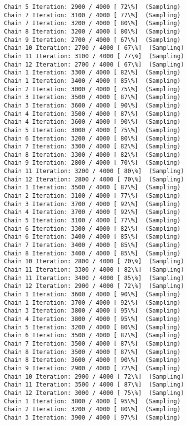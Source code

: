 \documentclass[11pt]{article}
\begin{document}
\begin{Verbatim}[commandchars=\\\{\}]
Chain 5 Iteration: 2900 / 4000 [ 72\%]  (Sampling)
Chain 7 Iteration: 3100 / 4000 [ 77\%]  (Sampling)
Chain 7 Iteration: 3200 / 4000 [ 80\%]  (Sampling)
Chain 8 Iteration: 3200 / 4000 [ 80\%]  (Sampling)
Chain 9 Iteration: 2700 / 4000 [ 67\%]  (Sampling)
Chain 10 Iteration: 2700 / 4000 [ 67\%]  (Sampling)
Chain 11 Iteration: 3100 / 4000 [ 77\%]  (Sampling)
Chain 12 Iteration: 2700 / 4000 [ 67\%]  (Sampling)
Chain 1 Iteration: 3300 / 4000 [ 82\%]  (Sampling)
Chain 1 Iteration: 3400 / 4000 [ 85\%]  (Sampling)
Chain 2 Iteration: 3000 / 4000 [ 75\%]  (Sampling)
Chain 3 Iteration: 3500 / 4000 [ 87\%]  (Sampling)
Chain 3 Iteration: 3600 / 4000 [ 90\%]  (Sampling)
Chain 4 Iteration: 3500 / 4000 [ 87\%]  (Sampling)
Chain 4 Iteration: 3600 / 4000 [ 90\%]  (Sampling)
Chain 5 Iteration: 3000 / 4000 [ 75\%]  (Sampling)
Chain 6 Iteration: 3200 / 4000 [ 80\%]  (Sampling)
Chain 7 Iteration: 3300 / 4000 [ 82\%]  (Sampling)
Chain 8 Iteration: 3300 / 4000 [ 82\%]  (Sampling)
Chain 9 Iteration: 2800 / 4000 [ 70\%]  (Sampling)
Chain 11 Iteration: 3200 / 4000 [ 80\%]  (Sampling)
Chain 12 Iteration: 2800 / 4000 [ 70\%]  (Sampling)
Chain 1 Iteration: 3500 / 4000 [ 87\%]  (Sampling)
Chain 2 Iteration: 3100 / 4000 [ 77\%]  (Sampling)
Chain 3 Iteration: 3700 / 4000 [ 92\%]  (Sampling)
Chain 4 Iteration: 3700 / 4000 [ 92\%]  (Sampling)
Chain 5 Iteration: 3100 / 4000 [ 77\%]  (Sampling)
Chain 6 Iteration: 3300 / 4000 [ 82\%]  (Sampling)
Chain 6 Iteration: 3400 / 4000 [ 85\%]  (Sampling)
Chain 7 Iteration: 3400 / 4000 [ 85\%]  (Sampling)
Chain 8 Iteration: 3400 / 4000 [ 85\%]  (Sampling)
Chain 10 Iteration: 2800 / 4000 [ 70\%]  (Sampling)
Chain 11 Iteration: 3300 / 4000 [ 82\%]  (Sampling)
Chain 11 Iteration: 3400 / 4000 [ 85\%]  (Sampling)
Chain 12 Iteration: 2900 / 4000 [ 72\%]  (Sampling)
Chain 1 Iteration: 3600 / 4000 [ 90\%]  (Sampling)
Chain 1 Iteration: 3700 / 4000 [ 92\%]  (Sampling)
Chain 3 Iteration: 3800 / 4000 [ 95\%]  (Sampling)
Chain 4 Iteration: 3800 / 4000 [ 95\%]  (Sampling)
Chain 5 Iteration: 3200 / 4000 [ 80\%]  (Sampling)
Chain 6 Iteration: 3500 / 4000 [ 87\%]  (Sampling)
Chain 7 Iteration: 3500 / 4000 [ 87\%]  (Sampling)
Chain 8 Iteration: 3500 / 4000 [ 87\%]  (Sampling)
Chain 8 Iteration: 3600 / 4000 [ 90\%]  (Sampling)
Chain 9 Iteration: 2900 / 4000 [ 72\%]  (Sampling)
Chain 10 Iteration: 2900 / 4000 [ 72\%]  (Sampling)
Chain 11 Iteration: 3500 / 4000 [ 87\%]  (Sampling)
Chain 12 Iteration: 3000 / 4000 [ 75\%]  (Sampling)
Chain 1 Iteration: 3800 / 4000 [ 95\%]  (Sampling)
Chain 2 Iteration: 3200 / 4000 [ 80\%]  (Sampling)
Chain 3 Iteration: 3900 / 4000 [ 97\%]  (Sampling)

\end{Verbatim}
\end{document}
